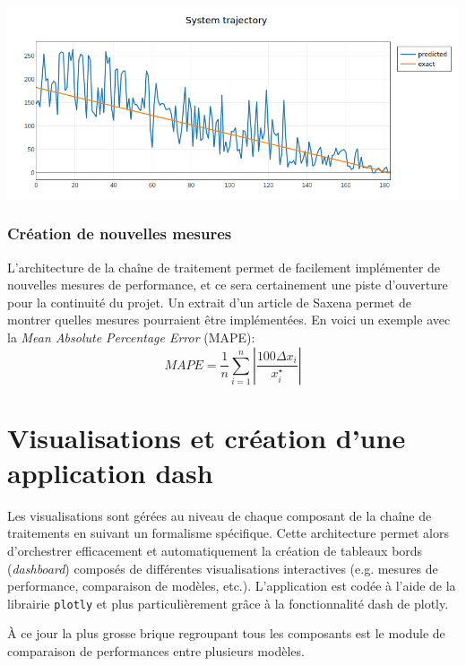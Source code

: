 \begin{center}
\includegraphics[width=1\textwidth]{figures/system_trajectory.png}
\label{fig13}
\end{center}

\subsection{Création de nouvelles mesures}

L’architecture de la chaîne de traitement permet de facilement implémenter de nouvelles mesures de performance, et ce sera certainement une piste d’ouverture pour la continuité du projet. Un extrait d’un article de Saxena \cite{metrics_saxena} permet de montrer quelles mesures pourraient être implémentées. En voici un exemple avec la \textit{Mean Absolute Percentage Error} (MAPE):
$$MAPE =\frac{1}{n}\sum_{i=1}^{n} \left \lvert \frac{100\Delta x_{i}}{x^{\star}_{i}} \right \rvert $$


\chapter{Visualisations et création d’une application dash}

Les visualisations sont gérées au niveau de chaque composant de la chaîne de traitements en suivant
un formalisme spécifique. Cette architecture
permet alors d'orchestrer efficacement et automatiquement la création de tableaux bords
(\textit{dashboard}) composés de différentes visualisations interactives (e.g. mesures de
performance, comparaison de modèles, etc.). L’application est codée à l’aide de la librairie \texttt{plotly} et plus particulièrement grâce à la fonctionnalité dash de plotly.

À ce jour la plus grosse brique regroupant tous les composants est le module de comparaison de
performances entre plusieurs modèles.

